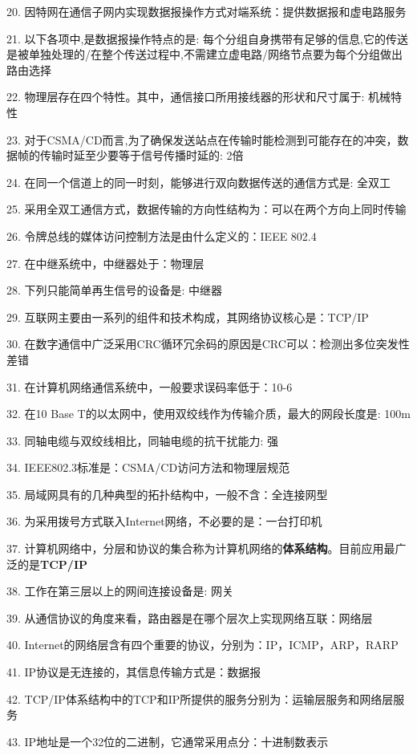 \documentclass[fleqn]{article}
\begin{document}
20. 因特网在通信子网内实现数据报操作方式对端系统：提供数据报和虚电路服务

21. 以下各项中,是数据报操作特点的是: 每个分组自身携带有足够的信息,它的传送是被单独处理的/在整个传送过程中,不需建立虚电路/网络节点要为每个分组做出路由选择

22. 物理层存在四个特性。其中，通信接口所用接线器的形状和尺寸属于: 机械特性

23. 对于CSMA/CD而言,为了确保发送站点在传输时能检测到可能存在的冲突，数据帧的传输时延至少要等于信号传播时延的: 2倍

24. 在同一个信道上的同一时刻，能够进行双向数据传送的通信方式是: 全双工

25. 采用全双工通信方式，数据传输的方向性结构为：可以在两个方向上同时传输

26. 令牌总线的媒体访问控制方法是由什么定义的：IEEE 802.4

27. 在中继系统中，中继器处于：物理层

28. 下列只能简单再生信号的设备是: 中继器

29. 互联网主要由一系列的组件和技术构成，其网络协议核心是：TCP/IP

30. 在数字通信中广泛采用CRC循环冗余码的原因是CRC可以：检测出多位突发性差错

31. 在计算机网络通信系统中，一般要求误码率低于：10-6

32. 在10 Base T的以太网中，使用双绞线作为传输介质，最大的网段长度是: 100m

33. 同轴电缆与双绞线相比，同轴电缆的抗干扰能力: 强

34. IEEE802.3标准是：CSMA/CD访问方法和物理层规范

35. 局域网具有的几种典型的拓扑结构中，一般不含：全连接网型

36. 为采用拨号方式联入Internet网络，不必要的是：一台打印机

37. 计算机网络中，分层和协议的集合称为计算机网络的{\bfseries 体系结构}。目前应用最广泛的是\textbf{TCP/IP}

38. 工作在第三层以上的网间连接设备是: 网关

39. 从通信协议的角度来看，路由器是在哪个层次上实现网络互联：网络层

40. Internet的网络层含有四个重要的协议，分别为：IP，ICMP，ARP，RARP 

41. IP协议是无连接的，其信息传输方式是：数据报

42. TCP/IP体系结构中的TCP和IP所提供的服务分别为：运输层服务和网络层服务

43. IP地址是一个32位的二进制，它通常采用点分：十进制数表示
\end{document}
